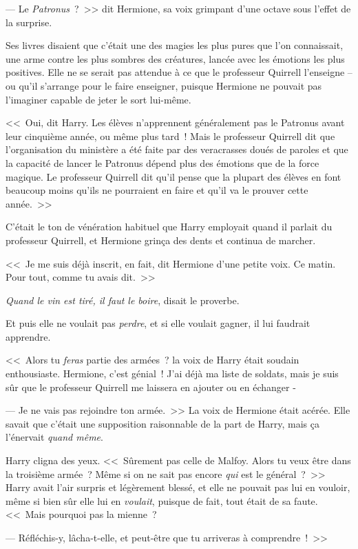 --- Le \emph{Patronus}~?~>> dit Hermione, sa voix grimpant d'une octave sous l'effet de la surprise.

Ses livres disaient que c'était une des magies les plus pures que l'on connaissait, une arme contre les plus sombres des créatures, lancée avec les émotions les plus positives. Elle ne se serait pas attendue à ce que le professeur Quirrell l'enseigne -- ou qu'il s'arrange pour le faire enseigner, puisque Hermione ne pouvait pas l'imaginer capable de jeter le sort lui-même.

<<~Oui, dit Harry. Les élèves n'apprennent généralement pas le Patronus avant leur cinquième année, ou même plus tard~! Mais le professeur Quirrell dit que l'organisation du ministère a été faite par des veracrasses doués de paroles et que la capacité de lancer le Patronus dépend plus des émotions que de la force magique. Le professeur Quirrell dit qu'il pense que la plupart des élèves en font beaucoup moins qu'ils ne pourraient en faire et qu'il va le prouver cette année.~>>

C'était le ton de vénération habituel que Harry employait quand il parlait du professeur Quirrell, et Hermione grinça des dents et continua de marcher.

<<~Je me suis déjà inscrit, en fait, dit Hermione d'une petite voix. Ce matin. Pour tout, comme tu avais dit.~>>

\emph{Quand le vin est tiré, il faut le boire}, disait le proverbe.

Et puis elle ne voulait pas \emph{perdre}, et si elle voulait gagner, il lui faudrait apprendre.

<<~Alors tu \emph{feras} partie des armées~? la voix de Harry était soudain enthousiaste. Hermione, c'est génial~! J'ai déjà ma liste de soldats, mais je suis sûr que le professeur Quirrell me laissera en ajouter ou en échanger -

--- Je ne vais pas rejoindre ton armée.~>> La voix de Hermione était acérée. Elle savait que c'était une supposition raisonnable de la part de Harry, mais ça l'énervait \emph{quand même}.

Harry cligna des yeux. <<~Sûrement pas celle de Malfoy. Alors tu veux être dans la troisième armée~? Même si on ne sait pas encore \emph{qui} est le général~?~>> Harry avait l'air surpris et légèrement blessé, et elle ne pouvait pas lui en vouloir, même si bien sûr elle lui en \emph{voulait}, puisque de fait, tout était de sa faute. <<~Mais pourquoi pas la mienne~?

--- Réfléchis-y, lâcha-t-elle, et peut-être que tu arriveras à comprendre~!~>>

